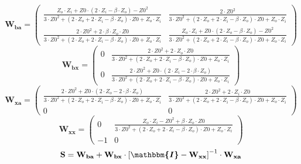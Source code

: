 \[ \mathbf{W_{ba}} = \left(\begin{smallmatrix} \frac{Z_o\cdot
Z_i+Z0\cdot \left(2\cdot Z_i-\beta\cdot Z_o\right)-Z0^2}{3\cdot
Z0^2+\left(2\cdot Z_o+2\cdot Z_i-\beta\cdot Z_o\right)\cdot
Z0+Z_o\cdot Z_i} & \frac{2\cdot Z0^2}{3\cdot Z0^2+\left(2\cdot
Z_o+2\cdot Z_i-\beta\cdot Z_o\right)\cdot Z0+Z_o\cdot Z_i} \\
\frac{2\cdot Z0^2+2\cdot \beta\cdot Z_o\cdot Z0}{3\cdot
Z0^2+\left(2\cdot Z_o+2\cdot Z_i-\beta\cdot Z_o\right)\cdot
Z0+Z_o\cdot Z_i} & \frac{Z_o\cdot Z_i+Z0\cdot \left(2\cdot
Z_o-\beta\cdot Z_o\right)-Z0^2}{3\cdot Z0^2+\left(2\cdot Z_o+2\cdot
Z_i-\beta\cdot Z_o\right)\cdot Z0+Z_o\cdot Z_i}
\end{smallmatrix}\right) \]
\[ \mathbf{W_{bx}} = \left(\begin{smallmatrix} 0 & \frac{2\cdot
Z0^2+2\cdot Z_o\cdot Z0}{3\cdot Z0^2+\left(2\cdot Z_o+2\cdot
Z_i-\beta\cdot Z_o\right)\cdot Z0+Z_o\cdot Z_i} \\ 0 & \frac{2\cdot
Z0^2+Z0\cdot \left(2\cdot Z_i-2\cdot \beta\cdot Z_o\right)}{3\cdot
Z0^2+\left(2\cdot Z_o+2\cdot Z_i-\beta\cdot Z_o\right)\cdot
Z0+Z_o\cdot Z_i} \end{smallmatrix}\right) \]
\[ \mathbf{W_{xa}} = \left(\begin{smallmatrix} \frac{2\cdot
Z0^2+Z0\cdot \left(2\cdot Z_o-2\cdot \beta\cdot Z_o\right)}{3\cdot
Z0^2+\left(2\cdot Z_o+2\cdot Z_i-\beta\cdot Z_o\right)\cdot
Z0+Z_o\cdot Z_i} & \frac{2\cdot Z0^2+2\cdot Z_i\cdot Z0}{3\cdot
Z0^2+\left(2\cdot Z_o+2\cdot Z_i-\beta\cdot Z_o\right)\cdot
Z0+Z_o\cdot Z_i} \\ 0 & 0 \end{smallmatrix}\right) \]
\[ \mathbf{W_{xx}} = \left(\begin{smallmatrix} 0 & \frac{Z_o\cdot
Z_i-Z0^2+\beta\cdot Z_o\cdot Z0}{3\cdot Z0^2+\left(2\cdot Z_o+2\cdot
Z_i-\beta\cdot Z_o\right)\cdot Z0+Z_o\cdot Z_i} \\ -1 & 0
\end{smallmatrix}\right) \]
\[ \mathbf{S}=\mathbf{W_{ba}}+\mathbf{W_{bx}}\cdot\left[
\boldsymbol{\mathbbm{I}}
-\mathbf{W_{xx}}\right]^{-1}\cdot\mathbf{W_{xa}} \]
